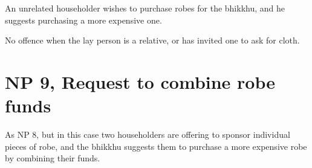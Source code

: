 An unrelated householder wishes to purchase robes for the bhikkhu, and
he suggests purchasing a more expensive one.

No offence when the lay person is a relative, or has invited one to ask
for cloth.

\section{NP 9, Request to combine robe funds}

As NP 8, but in this case two householders are offering to sponsor
individual pieces of robe, and the bhikkhu suggests them to purchase a
more expensive robe by combining their funds.

